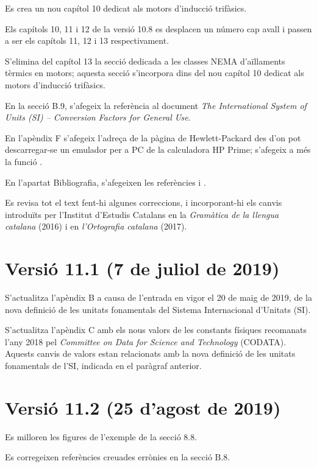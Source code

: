 Es crea un nou capítol 10 dedicat als motors d'inducció trifàsics.

Els capítols 10, 11 i 12 de la versió 10.8 es desplacen un número cap
avall i passen a ser els capítols 11, 12 i 13 respectivament.

S'elimina del capítol 13 la secció dedicada a les classes NEMA d’aïllaments tèrmics en motors; aquesta secció s'incorpora dins del nou capítol 10 dedicat als motors d'inducció trifàsics.

En la secció B.9, s'afegeix la referència al document \textit{The International System of Units (SI) – Conversion Factors for General Use}.

En l'apèndix F s'afegeix l'adreça de la pàgina de Hewlett-Packard des d'on pot descarregar-se un emulador per a PC de la calculadora \textsf{HP Prime}; s'afegeix a més la funció .

En l’apartat Bibliografia, s’afegeixen les referències  \cite{JFM} i \cite{WES}.

Es revisa tot el text fent-hi algunes correccions,  i incorporant-hi els canvis introduïts per l’Institut d’Estudis Catalans en la \emph{Gramàtica de la llengua catalana}
(2016) i en \emph{l’Ortografia catalana} (2017).


\section*{Versió 11.1 (7 de juliol de 2019)}

S'actualitza l'apèndix B a causa de l'entrada en vigor el 20 de maig de 2019, de la nova definició de les unitats fonamentals del Sistema Internacional d'Unitats (SI).

S'actualitza l'apèndix  C amb els nous valors de les constants físiques recomanats l'any 2018 pel \textit{Committee on Data for Science and Technology} (CODATA). Aquests canvis de  valors estan  relacionats amb la nova definició de les unitats fonamentals de l'SI, indicada en el paràgraf anterior.

\section*{Versió 11.2 (25 d'agost de 2019)}

Es milloren les figures de l'exemple de la secció 8.8.

Es corregeixen referències creuades errònies en la secció B.8.

